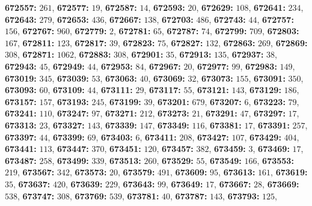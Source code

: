 \textsf{\bfseries 672557:} $261$, \textsf{\bfseries 672577:} $19$, \textsf{\bfseries 672587:} $14$, \textsf{\bfseries 672593:} $20$, \textsf{\bfseries 672629:} $108$, \textsf{\bfseries 672641:} $234$, \textsf{\bfseries 672643:} $279$, \textsf{\bfseries 672653:} $436$, \textsf{\bfseries 672667:} $138$, \textsf{\bfseries 672703:} $486$, \textsf{\bfseries 672743:} $44$, \textsf{\bfseries 672757:} $156$, \textsf{\bfseries 672767:} $960$, \textsf{\bfseries 672779:} $2$, \textsf{\bfseries 672781:} $65$, \textsf{\bfseries 672787:} $74$, \textsf{\bfseries 672799:} $709$, \textsf{\bfseries 672803:} $167$, \textsf{\bfseries 672811:} $123$, \textsf{\bfseries 672817:} $39$, \textsf{\bfseries 672823:} $75$, \textsf{\bfseries 672827:} $132$, \textsf{\bfseries 672863:} $269$, \textsf{\bfseries 672869:} $308$, \textsf{\bfseries 672871:} $1062$, \textsf{\bfseries 672883:} $308$, \textsf{\bfseries 672901:} $35$, \textsf{\bfseries 672913:} $135$, \textsf{\bfseries 672937:} $38$, \textsf{\bfseries 672943:} $45$, \textsf{\bfseries 672949:} $44$, \textsf{\bfseries 672953:} $84$, \textsf{\bfseries 672967:} $20$, \textsf{\bfseries 672977:} $99$, \textsf{\bfseries 672983:} $149$, \textsf{\bfseries 673019:} $345$, \textsf{\bfseries 673039:} $53$, \textsf{\bfseries 673063:} $40$, \textsf{\bfseries 673069:} $32$, \textsf{\bfseries 673073:} $155$, \textsf{\bfseries 673091:} $350$, \textsf{\bfseries 673093:} $60$, \textsf{\bfseries 673109:} $44$, \textsf{\bfseries 673111:} $29$, \textsf{\bfseries 673117:} $55$, \textsf{\bfseries 673121:} $143$, \textsf{\bfseries 673129:} $186$, \textsf{\bfseries 673157:} $157$, \textsf{\bfseries 673193:} $245$, \textsf{\bfseries 673199:} $39$, \textsf{\bfseries 673201:} $679$, \textsf{\bfseries 673207:} $6$, \textsf{\bfseries 673223:} $79$, \textsf{\bfseries 673241:} $110$, \textsf{\bfseries 673247:} $97$, \textsf{\bfseries 673271:} $212$, \textsf{\bfseries 673273:} $21$, \textsf{\bfseries 673291:} $47$, \textsf{\bfseries 673297:} $17$, \textsf{\bfseries 673313:} $23$, \textsf{\bfseries 673327:} $143$, \textsf{\bfseries 673339:} $147$, \textsf{\bfseries 673349:} $116$, \textsf{\bfseries 673381:} $17$, \textsf{\bfseries 673391:} $257$, \textsf{\bfseries 673397:} $44$, \textsf{\bfseries 673399:} $69$, \textsf{\bfseries 673403:} $6$, \textsf{\bfseries 673411:} $208$, \textsf{\bfseries 673427:} $107$, \textsf{\bfseries 673429:} $404$, \textsf{\bfseries 673441:} $113$, \textsf{\bfseries 673447:} $370$, \textsf{\bfseries 673451:} $120$, \textsf{\bfseries 673457:} $382$, \textsf{\bfseries 673459:} $3$, \textsf{\bfseries 673469:} $17$, \textsf{\bfseries 673487:} $258$, \textsf{\bfseries 673499:} $339$, \textsf{\bfseries 673513:} $260$, \textsf{\bfseries 673529:} $55$, \textsf{\bfseries 673549:} $166$, \textsf{\bfseries 673553:} $219$, \textsf{\bfseries 673567:} $342$, \textsf{\bfseries 673573:} $20$, \textsf{\bfseries 673579:} $491$, \textsf{\bfseries 673609:} $95$, \textsf{\bfseries 673613:} $161$, \textsf{\bfseries 673619:} $35$, \textsf{\bfseries 673637:} $420$, \textsf{\bfseries 673639:} $229$, \textsf{\bfseries 673643:} $99$, \textsf{\bfseries 673649:} $17$, \textsf{\bfseries 673667:} $28$, \textsf{\bfseries 673669:} $538$, \textsf{\bfseries 673747:} $308$, \textsf{\bfseries 673769:} $539$, \textsf{\bfseries 673781:} $40$, \textsf{\bfseries 673787:} $143$, \textsf{\bfseries 673793:} $125$, 
